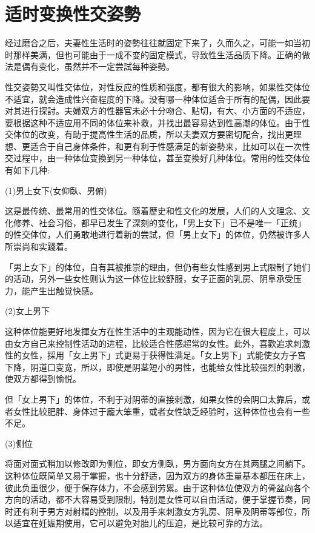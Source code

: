 \documentclass[12pt,UTF8]{ctexbook}
\begin{document}
\section{适时变换性交姿勢}

经过磨合之后，夫妻性生活时的姿勢往往就固定下来了，久而久之，可能一如当初时那样美满，但也可能由于一成不变的固定模式，导致性生活品质下降。正确的做法是偶有变化，虽然并不一定尝試每种姿勢。

性交姿勢又叫性交体位，对性反应的性质和强度，都有很大的影响，如果性交体位不适宜，就会造成性兴奋程度的下降。没有哪一种体位适合于所有的配偶，因此要对其进行探討。夫婦双方的性器官未必十分吻合、贴切，有大、小方面的不适应，要根据这种不适应用不同的体位来补救，并找出最容易达到性高潮的体位。由于性交体位的改变，有助于提高性生活的品质，所以夫妻双方要密切配合，找出更理想、更适合于自己身体条件，和更有利于性感满足的新姿勢来，比如可以在一次性交过程中，由一种体位变換到另一种体位，甚至变換好几种体位。常用的性交体位有如下几种:

(1)男上女下(女仰臥、男俯)

这是最传统、最常用的性交体位。隨着歷史和性文化的发展，人们的人文理念、文化修养、社会习俗，都早已发生了深刻的变化，「男上女下」已不是唯一「正统」的性交体位，人们勇敢地进行着新的尝試，但「男上女下」的体位，仍然被许多人所崇尚和实踐着。

「男上女下」的体位，自有其被推崇的理由，但仍有些女性感到男上式限制了她们的活动，另外一些女性则认为这一体位比较舒服，女子正面的乳房、阴阜承受压力，能产生出触觉快感。

(2)女上男下

这种体位能更好地发揮女方在性生活中的主观能动性，因为它在很大程度上，可以由女方自己来控制性活动的进程，比较适合性感超常的女性。此外，喜歡追求刺激性的女性，採用「女上男下」式更易于获得性满足。「女上男下」式能使女方子宫下降，阴道口变宽，所以，即使是阴茎短小的男性，也能给女性比较强烈的刺激，使双方都得到愉悦。

但「女上男下」的体位，不利于对阴蒂的直接刺激，如果女性的会阴口太靠后，或者女性比较肥胖、身体过于龐大笨重，或者女性缺乏经验时，这种体位也会有一些不足。

(3)侧位

将面对面式稍加以修改即为侧位，即女方侧臥，男方面向女方在其两腿之间躺下。这种体位既简单又易于掌握，也十分舒适，因为双方的身体重量基本都压在床上，彼此负重很少，便于保存体力，不会感到劳累。由于这种体位使双方的骨盆向各个方向的活动，都不大容易受到限制，特別是女性可以自由活动，便于掌握节奏，同时还有利于男方对射精的控制，以及用手来刺激女方乳房、阴阜及阴蒂等部位，所以适宜在妊娠期使用，它可以避免对胎儿的压迫，是比较可靠的方法。
\end{document}
